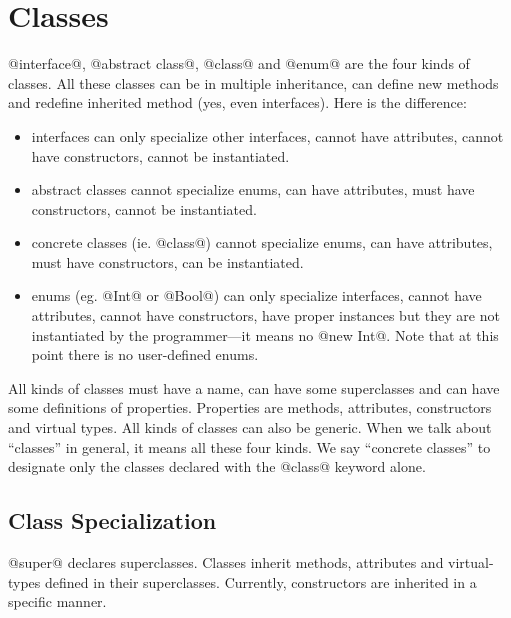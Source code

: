 \section{Classes}\label{class}

@interface@, @abstract class@, @class@ and @enum@ are the four kinds of classes. All these classes can be in multiple inheritance, can define new methods and redefine inherited method (yes, even interfaces). Here is the difference:
\begin{itemize}
\item interfaces can only specialize other interfaces, cannot have attributes, cannot have constructors, cannot be instantiated.
\item abstract classes cannot specialize enums, can have attributes, must have constructors, cannot be instantiated.
\item concrete classes (ie. @class@) cannot specialize enums, can have attributes, must have constructors, can be instantiated.
\item enums (eg. @Int@ or @Bool@) can only specialize interfaces, cannot have attributes, cannot have constructors, have proper instances but they are not instantiated by the programmer---it means no @new Int@. Note that at this point there is no user-defined enums.
\end{itemize}

All kinds of classes must have a name, can have some superclasses and can have some definitions of properties.
Properties are methods, attributes, constructors and virtual types.
All kinds of classes can also be generic.
When we talk about ``classes'' in general, it means all these four kinds.
We say ``concrete classes'' to designate only the classes declared with the @class@ keyword alone.

\subsection{Class Specialization}\label{superclass}

@super@ declares superclasses.
Classes inherit methods, attributes and virtual-types defined in their superclasses.
Currently, constructors are inherited in a specific manner.


